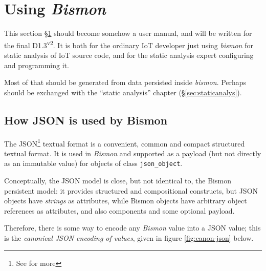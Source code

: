 \section{Using \emph{Bismon}}
\label{sec:using}

This section §\ref{sec:using} should become somehow a user manual, and
will be written for the final D1.3\textsuperscript{v2}. It is both for
the ordinary IoT developer just using \emph{bismon} for static
analysis of IoT source code, and for the static analysis expert
configuring and programming it.

Most of that should be generated from data persisted inside \emph{bismon}. Perhaps
should be exchanged with the ``static analysis'' chapter
(§\ref{sec:staticanalys}).




\subsection{How JSON is used by Bismon}
\label{subsec:json-usage}

The JSON\footnote{See  for more} 
textual format is a convenient, common and compact structured textual
format. It is used in \emph{Bismon} and supported as a payload
 (but not directly as an immutable value) for objects
of class \texttt{json\_object}.

Conceptually, the JSON model is close, but not identical to, the
Bismon persistent model: it provides structured and compositional
%
%
%
%
constructs, but JSON objects have \emph{strings} as attributes, while
Bismon objects have arbitrary object references as attributes, and
also components and some optional payload.

Therefore, there is some way to encode any \emph{Bismon} value into a JSON value; this is the \emph{canonical JSON encoding of values}, given in figure \ref{fig:canon-json} below.

